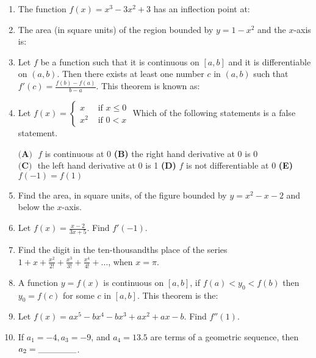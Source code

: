 \documentclass[../uilmath.tex]{subfiles}
\begin{document}
\begin{enumerate}[label=\bfseries\arabic*.]
    \item %
    The function $f(x)=x^3-3x^2+3$ has an inflection point at:

    \item %
    The area (in square units) of the region bounded by $y=1-x^2$ and the $x$-axis is:

    \item %
    Let $f$ be a function such that it is continuous on $[a,b]$ and it is differentiable on $(a,b)$.
    Then there exists at least one number $c$ in $(a,b)$ such that $f'(c)=\frac{f(b)-f(a)}{b-a}$. This theorem is known as:

    \item %
    Let $f(x)=
    \begin{cases}
        x & \text{ if } x\leq 0 \\
        x^2 & \text{ if } 0<x 
    \end{cases}$
    Which of the following statements is a false statement.

        $\textbf{(A) }$ $f$ is continuous at 0 \qquad \textbf{(B) } the right hand derivative at 0 is 0 \\
        $\textbf{(C) }$ the left hand derivative at 0 is 1 \qquad \textbf{(D) } $f$ is not differentiable at 0 \textbf{(E) } $f(-1)=f(1)$

    \item %
    Find the area, in square units, of the figure bounded by $y=x^2-x-2$ and below the $x$-axis.

    \item %
    Let $f(x)=\frac{x-2}{3x+5}$. Find $f'(-1)$.

    \item %
    Find the digit in the ten-thousandths place of the series $1+x+\frac{x^2}{2!}+\frac{x^3}{3!}+\frac{x^4}{4!}+\dots$, when $x=\pi$.

    \item %
    A function $y=f(x)$ is continuous on $[a,b]$, if $f(a)<y_0<f(b)$ then $y_0=f(c)$ for some $c$ in $[a,b]$. This theorem is the: 

    \item %
    Let $f(x)=ax^5-bx^4-bx^3+ax^2+ax-b$. Find $f''(1)$.

    \item %
    If $a_1=-4, a_3=-9$, and $a_4=13.5$ are terms of a geometric sequence, then $a_2=\_\_\_\_\_\_$.


\end{enumerate}
\end{document}
